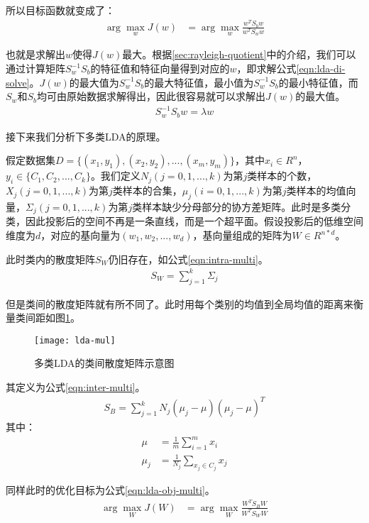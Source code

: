所以目标函数就变成了：
\begin{align}
\label{eqn:lda-obj-bi-rui}
\arg\mathop{\max}_{w} J(w)  &= \arg\mathop{\max}_{w} \frac{w^{T}S_{b}w}{w^{T}S_{w}w} 
\end{align}

也就是求解出$w$使得$J(w)$最大。根据\ref{sec:rayleigh-quotient}中的介绍，我们可以通过计算矩阵$S_{w}^{-1}S_{b}$的特征值和特征向量得到对应的$w$，即求解公式\ref{eqn:lda-di-solve}。$J(w)$的最大值为$S_{w}^{-1}S_{b}$的最大特征值，最小值为$S_{w}^{-1}S_{b}$的最小特征值，而$S_w$和$S_b$均可由原始数据求解得出，因此很容易就可以求解出$J(w)$的最大值。
\begin{align}
\label{eqn:lda-di-solve}
S_{w}^{-1}S_{b}w = \lambda{w}
\end{align}

接下来我们分析下多类LDA的原理。

假定数据集$D=\{(x_1, y_1), (x_2, y_2), ..., (x_m, y_m)\}$，其中$x_i \in R^{n}$，$y_i \in \{C_1, C_2, ..., C_k\}$。我们定义$N_j (j=0,1,...,k)$为第$j$类样本的个数，$X_j (j=0,1,...,k)$为第$j$类样本的合集，$\mu_j (i=0,1,...,k)$为第$j$类样本的均值向量，$\Sigma_j (j=0,1,...,k)$为第$j$类样本缺少分母部分的协方差矩阵。此时是多类分类，因此投影后的空间不再是一条直线，而是一个超平面。假设投影后的低维空间维度为$d$，对应的基向量为$(w_1, w_2,..., w_d)$，基向量组成的矩阵为$W\in{R^{n*d}}$。

此时类内的散度矩阵$S_W$仍旧存在，如公式\ref{eqn:intra-multi}。
\begin{align}
\label{eqn:intra-multi}
S_W = \sum_{j=1}^{k} \Sigma_{j} 
\end{align}

但是类间的散度矩阵就有所不同了。此时用每个类别的均值到全局均值的距离来衡量类间距如图\ref{fig:lda-mul}。
\begin{figure}[htbp]
  \centering
  \texttt{[image: lda-mul]}
  \caption{多类LDA的类间散度矩阵示意图 \label{fig:lda-mul}}
\end{figure}

其定义为公式\ref{eqn:inter-multi}。
\begin{align}
\label{eqn:inter-multi}
S_B = \sum_{j=1}^{k} N_j (\mu_{j} - \mu)(\mu_{j} -\mu)^{T}
\end{align}
其中：
\begin{align}
\mu     &= \frac{1}{m}\sum_{i=1}^{m} x_{i} \\
\mu_{j} &= \frac{1}{N_{j}}\sum_{x_{j}\in{C_{j}}} x_{j}
\end{align}

同样此时的优化目标为公式\ref{eqn:lda-obj-multi}。
\begin{align}
\label{eqn:lda-obj-multi}
\arg\mathop{\max}_{W} J(W)  &= \arg\mathop{\max}_{W} \frac{W^{T}S_{B}W}{W^{T}S_{W}W} 
\end{align}


